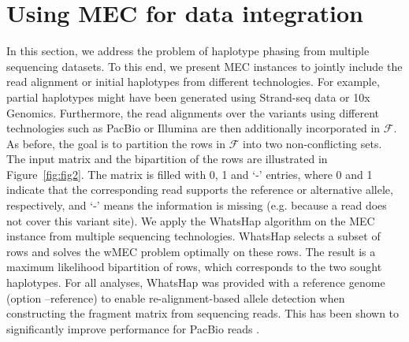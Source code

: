 \section{Using MEC for data integration}
In this section, we address the problem of haplotype phasing from multiple sequencing datasets.
To this end, we present MEC instances to jointly include the read alignment or initial haplotypes from different technologies.
For example, partial haplotypes might have been generated using Strand-seq data or 10x Genomics. Furthermore, the read alignments over the variants using different technologies such as PacBio or Illumina are then additionally incorporated in $\mathcal{F}$.
As before, the goal is to partition the rows in $\mathcal{F}$ into two non-conflicting sets.
The input matrix and the bipartition of the rows are illustrated in Figure~\ref{fig:fig2}.
The matrix is filled with 0, 1 and ‘-’ entries, where 0 and 1 indicate that the corresponding read supports the reference or alternative allele, respectively,  and ‘-’ means the information is missing 
(e.g. because a read does not cover this variant site). We apply the WhatsHap algorithm \citep{Patterson2015} on the MEC instance from multiple sequencing technologies.
WhatsHap selects a subset of rows and solves the wMEC problem optimally on these rows. 
The result is a maximum likelihood bipartition of rows, which corresponds to the two sought haplotypes.
For all analyses, WhatsHap was provided with a reference genome (option --reference) to enable re-alignment-based allele detection when constructing the fragment matrix from sequencing reads. 
This has been shown to significantly improve performance for PacBio reads \citep{martin2016whatshap}.


